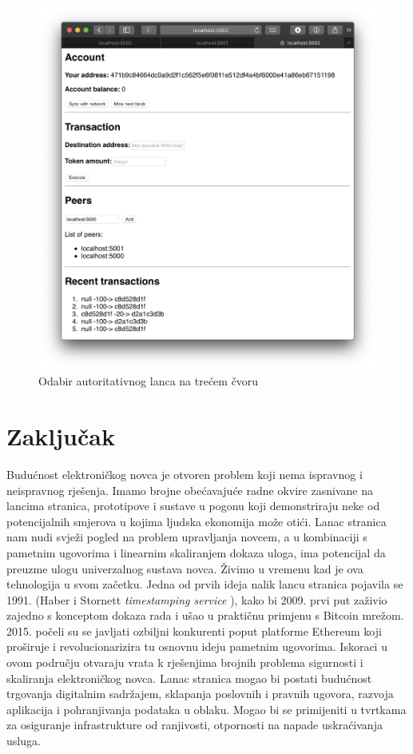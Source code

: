 \documentclass[utf8, zavrsni]{fer}
\begin{document}
\begin{figure}[H]
    \centering
    \includegraphics[width=\textwidth]{autoritativni_najdulji_lanac.png}
    \caption{Odabir autoritativnog lanca na trećem čvoru}
    \label{fig:autoritativni}
\end{figure}

\chapter{Zaključak}
Budućnost elektroničkog novca je otvoren problem koji nema ispravnog i neispravnog rješenja. Imamo brojne obećavajuće radne okvire zasnivane na lancima stranica, prototipove i sustave u pogonu koji demonstriraju neke od potencijalnih smjerova u kojima ljudska ekonomija može otići. Lanac stranica nam nudi svježi pogled na problem upravljanja novcem, a u kombinaciji s pametnim ugovorima i linearnim skaliranjem dokaza uloga, ima potencijal da preuzme ulogu univerzalnog sustava novca. Živimo u vremenu kad je ova tehnologija u svom začetku. Jedna od prvih ideja nalik lancu stranica pojavila se 1991. (Haber i Stornett \textit{timestamping service} \cite{enwiki:1016411321}), kako bi 2009. prvi put zaživio zajedno s konceptom dokaza rada i ušao u praktičnu primjenu s Bitcoin mrežom. 2015. počeli su se javljati ozbiljni konkurenti poput platforme Ethereum koji proširuje i revolucionarizira tu osnovnu ideju pametnim ugovorima. Iskoraci u ovom području otvaraju vrata k rješenjima brojnih problema sigurnosti i skaliranja elektroničkog novca. Lanac stranica mogao bi postati budućnost trgovanja digitalnim sadržajem, sklapanja poslovnih i pravnih ugovora, razvoja aplikacija i pohranjivanja podataka u oblaku. Mogao bi se primijeniti u tvrtkama za osiguranje infrastrukture od ranjivosti, otpornosti na napade uskraćivanja usluga.
\end{document}
